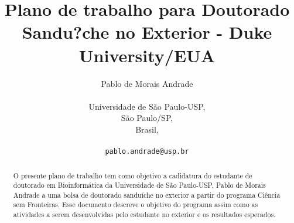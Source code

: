 \documentclass{article}
\title{Plano de trabalho para Doutorado Sandu?che no Exterior - Duke University/EUA}
\begin{document}
\author{Pablo de Morais Andrade\\\\
		Universidade de São Paulo-USP,\\
  		São Paulo/SP,\\
  		Brasil,\\\\
  \texttt{pablo.andrade@usp.br}}
\maketitle

\begin{abstract}
O presente plano de trabalho tem como objetivo a cadidatura do estudante de doutorado em Bioinformática da 
Universidade de São Paulo-USP, Pablo de Morais Andrade a uma bolsa de doutorado sanduíche no exterior 
a partir do programa Ciência sem Fronteiras. 
Esse documento descreve o objetivo do programa assim como as atividades a serem desenvolvidas pelo 
estudante no exterior e os resultados esperados.
\end{abstract}
\end{document}
